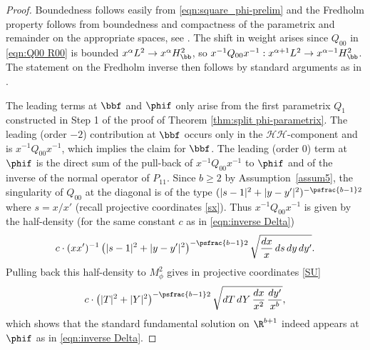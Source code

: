 \begin{proof}
Boundedness follows easily from \eqref{eqn:square_phi-prelim} and the Fredholm property follows from boundedness and compactness of the parametrix and remainder on the appropriate spaces, see \cite[Th.\,13]{grieser-para}. The shift in weight arises since $Q_{00}$ in \eqref{eqn:Q00 R00} is bounded $x^\alpha L^2\to x^\alpha H^2_\bb$, so $x^{-1}Q_{00}x^{-1}: x^{\alpha+1}L^2\to x^{\alpha-1}H^2_\bb$. The statement on the Fredholm inverse then follows by standard arguments as in
\cite[Prop.\,5.42 \& 5.64]{melrose1993atiyah}.

The leading terms at $\bbf$ and $\phif$ only arise from the first parametrix $Q_1$ constructed in Step 1 of the proof of Theorem \ref{thm:split phi-parametrix}. The leading (\ie order $-2$) contribution at $\bbf$ occurs only in the $\mathscr{H}\mathscr{H}$-component and is $x^{-1}Q_{00}x^{-1}$, which implies the claim for $\bbf$.
The leading (\ie order $0$) term at $\phif$ is the direct sum of the pull-back of $x^{-1}Q_{00}x^{-1}$ to $\phif$ and of the inverse of the normal operator of $P_{11}$. Since $b\geq2$ by Assumption~\ref{assum5}, the singularity of $Q_{00}$ at the diagonal is of the type $(|s-1|^2+|y-y'|^2)^{-\psfrac{b-1}2}$ where $s=x/x'$ (recall projective
coordinates \eqref{sx}). Thus $x^{-1}Q_{00}x^{-1}$ is given
by the half-density (for the same constant $c$ as in \eqref{eqn:inverse Delta})\vspace*{-3pt}
\[
c \cdot (xx')^{-1}\left(|s-1|^2+|y-y'|^2\right)^{-\psfrac{b-1}2} \sqrt{\frac{dx}x\, ds\, dy\,dy'}.
\]
Pulling back this half-density to $M^2_\phi$ gives in projective coordinates \eqref{SU}\vspace*{-3pt}
\[
c \cdot \left(|T|^2+|Y|^2\right)^{-\psfrac{b-1}2} \sqrt{dT\,dY\,\frac{dx}{x^2}\,\frac{dy'}{x^b}},
\]
which shows that the standard fundamental solution on $\R^{b+1}$
indeed appears at $\phif$ as in \eqref{eqn:inverse Delta}.
\end{proof}

